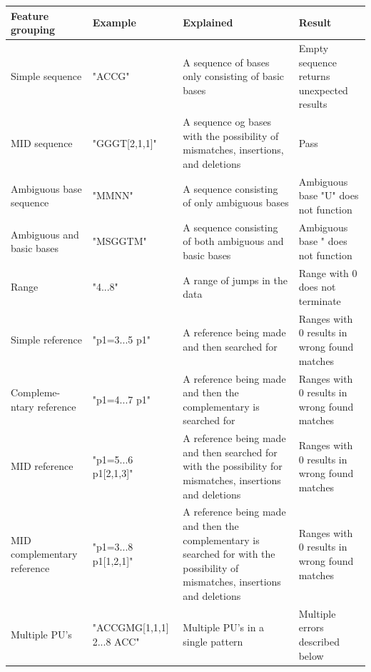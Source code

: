 \documentclass[12pt]{article}
\newcommand{\textapprox}{\raisebox{0.5ex}{\texttildelow}}
\newcommand{\pus}{PU's }
\begin{document}
\begin{table}[H]
\begin{tabular}{p{2cm}|p{3cm}|p{5cm}|p{4.5cm}}
Feature grouping & Example & Explained & Result  \\ \hline

Simple sequence		& "ACCG"  & A sequence of bases only consisting of basic bases & Empty sequence returns unexpected results\\ \hline

MID sequence 		& "GGGT[2,1,1]" & A sequence og bases with the possibility of mismatches, insertions, and deletions & Pass \\ \hline

Ambiguous base sequence	& "MMNN" & A sequence consisting of only ambiguous bases & Ambiguous base "U" does not function\\ \hline

Ambiguous and basic bases & "MSGGTM" & A sequence consisting of both ambiguous and basic bases & Ambiguous base " does not function\\ \hline

Range & "4...8" & A range of jumps in the data & Range with 0 does not terminate\\ \hline

Simple reference & "p1=3...5 p1" & A reference being made and then searched for  & Ranges with 0 results in wrong found matches\\ \hline

Compleme- ntary reference & "p1=4...7 \textapprox p1" & A reference being made and then the complementary is searched for & Ranges with 0 results in wrong found matches \\ \hline

MID reference & "p1=5...6 p1[2,1,3]" & A reference being made and then searched for with the possibility for mismatches, insertions and deletions & Ranges with 0 results in wrong found matches\\ \hline

MID complementary reference & "p1=3...8 \textapprox p1[1,2,1]" & A reference being made and then the complementary is searched for with the possibility of mismatches, insertions and deletions & Ranges with 0 results in wrong found matches\\ \hline

Multiple \pus & "ACCGMG[1,1,1] 2...8 ACC" & Multiple \pus in a single pattern & Multiple errors described below

\end{tabular}
\end{table}
\end{document}
